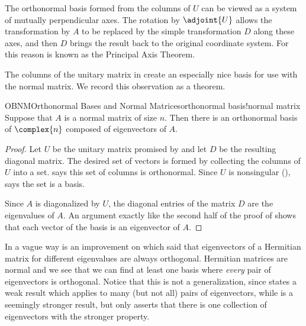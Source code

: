 %
The orthonormal basis formed from the columns of $U$ can be viewed as a system of mutually perpendicular axes.  The rotation by $\adjoint{U}$ allows the transformation by $A$ to be replaced by the simple transformation $D$ along these axes, and then $D$ brings the result back to the original coordinate system.  For this reason  is known as the Principal Axis Theorem.  \par
%
The columns of the unitary matrix in  create an especially nice basis for use with the normal matrix.  We record this observation as a theorem.
%
\begin{theorem}{OBNM}{Orthonormal Bases and Normal Matrices}{orthonormal basis!normal matrix}
Suppose that $A$ is a normal matrix of size $n$.  Then there is an orthonormal basis of $\complex{n}$ composed of eigenvectors of $A$.
\end{theorem}
%
\begin{proof}
Let $U$ be the unitary matrix promised by  and let $D$ be the resulting diagonal matrix.  The desired set of vectors is formed by collecting the columns of $U$ into a set.   says this set of columns is orthonormal.  Since $U$ is nonsingular (),  says the set is a basis.\par
%
Since $A$ is diagonalized by $U$, the diagonal entries of the matrix $D$ are the eigenvalues of $A$.  An argument exactly like the second half of the proof of  shows that each vector of the basis is an eigenvector of $A$.
%
\end{proof}
%
In a vague way  is an improvement on  which said that eigenvectors of a Hermitian matrix for different eigenvalues are always orthogonal.  Hermitian matrices are normal and we see that we can find at least one basis where {\em every} pair of eigenvectors is orthogonal.  Notice that this is not a generalization, since  states a weak result which applies to many (but not all) pairs of eigenvectors, while  is a seemingly stronger result, but only asserts that there is one collection of eigenvectors with the stronger property.
%
  
  

